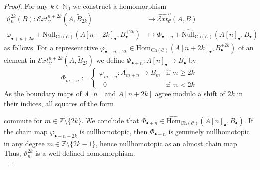 \documentclass[12pt,a4paper]{article}
\numberwithin{equation}{section}
\theoremstyle{nonumberplain}
\newtheorem{proof}{Proof}
\begin{document}
\begin{proof}
For any $k \in \mathbb{N}_0$ we construct a homomorphism
\begin{align*}
\vartheta_{n}^{2k}(B): \mathcal{E}xt_{\mathcal{C}}^{n+2k}(A, \widetilde{B}_{2k}) &\rightarrow \widehat{\mathcal{E}xt}_{\mathcal{C}}^n(A, B) \\
\varphi_{\bullet+n+2k} + \mathrm{Null}_{\mathrm{Ch}(\mathcal{C})}(A[n+2k]_{\bullet}, B_{\bullet}^{+2k}) &\mapsto \Phi_{\bullet+n} + \widehat{\mathrm{Null}}_{\mathrm{Ch}(\mathcal{C})}(A[n]_{\bullet}, B_{\bullet})
\end{align*}
as follows. For a representative $\varphi_{\bullet+n+2k} \in \mathrm{Hom}_{\mathrm{Ch}(\mathcal{C})}(A[n+2k]_{\bullet}, B_{\bullet}^{+2k})$ of an element in $\mathcal{E}xt_{\mathcal{C}}^{n+2k}(A, \widetilde{B}_{2k})$ we define $\Phi_{\bullet+n}: A[n]_{\bullet} \rightarrow B_{\bullet}$ by
\[ \Phi_{m+n} := \begin{cases} \varphi_{m+n}: A_{m+n} \rightarrow B_m &\text{if } m \geq 2k \\ \; \; 0 &\text{if } m < 2k \end{cases} \]
As the boundary maps of $A[n]$ and $A[n+2k]$ agree modulo a shift of $2k$ in their indices, all squares of the form
\begin{center}
\end{center}
commute for $m \in \mathbb{Z} \setminus \lbrace 2k \rbrace$. We conclude that $\Phi_{\bullet+n} \in \widehat{\mathrm{Hom}}_{\mathrm{Ch}(\mathcal{C})}(A[n]_{\bullet}, B_{\bullet})$. If the chain map $\varphi_{\bullet+n+2k}$ is nullhomotopic, then $\Phi_{\bullet+n}$ is genuinely nullhomotopic in any degree $m \in \mathbb{Z} \setminus \lbrace 2k-1 \rbrace$, hence nullhomotopic as an almost chain map. Thus, $\vartheta_{n}^{2k}$ is a well defined homomorphism. \\


\end{proof}
\end{document}
